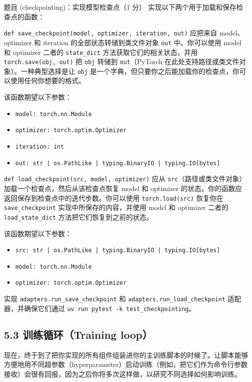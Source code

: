 \begin{problembox}{题目 (checkpointing)：实现模型检查点（1 分）}
实现以下两个用于加载和保存检查点的函数：

\texttt{def save\_checkpoint(model, optimizer, iteration, out)} 应把来自 model、optimizer 和 iteration 的全部状态转储到类文件对象 \texttt{out} 中。你可以使用 model 和 optimizer 二者的 \texttt{state\_dict} 方法获取它们的相关状态，并用 \texttt{torch.save(obj, out)} 把 \texttt{obj} 转储到 \texttt{out}（PyTorch 在此处支持路径或类文件对象）。一种典型选择是让 \texttt{obj} 是一个字典，但只要你之后能加载你的检查点，你可以使用任何你想要的格式。

该函数期望以下参数：
\begin{itemize}
\item \texttt{model: torch.nn.Module}
\item \texttt{optimizer: torch.optim.Optimizer}
\item \texttt{iteration: int}
\item \texttt{out: str | os.PathLike | typing.BinaryIO | typing.IO[bytes]}
\end{itemize}

\texttt{def load\_checkpoint(src, model, optimizer)} 应从 \texttt{src}（路径或类文件对象）加载一个检查点，然后从该检查点恢复 model 和 optimizer 的状态。你的函数应返回保存到检查点中的迭代步数。你可以使用 \texttt{torch.load(src)} 恢复你在 \texttt{save\_checkpoint} 实现中所保存的内容，并使用 model 和 optimizer 二者的 \texttt{load\_state\_dict} 方法把它们恢复到之前的状态。

该函数期望以下参数：
\begin{itemize}
\item \texttt{src: str | os.PathLike | typing.BinaryIO | typing.IO[bytes]}
\item \texttt{model: torch.nn.Module}
\item \texttt{optimizer: torch.optim.Optimizer}
\end{itemize}

实现 \texttt{adapters.run\_save\_checkpoint} 和 \texttt{adapters.run\_load\_checkpoint} 适配器，并确保它们通过 \texttt{uv run pytest -k test\_checkpointing}。
\end{problembox}

\subsection*{5.3 训练循环（Training loop）}

现在，终于到了把你实现的所有组件组装进你的主训练脚本的时候了。让脚本能够方便地用不同超参数（hyperparameter）启动训练（例如，把它们作为命令行参数接收）会很有回报，因为之后你将多次这样做，以研究不同选择如何影响训练。

